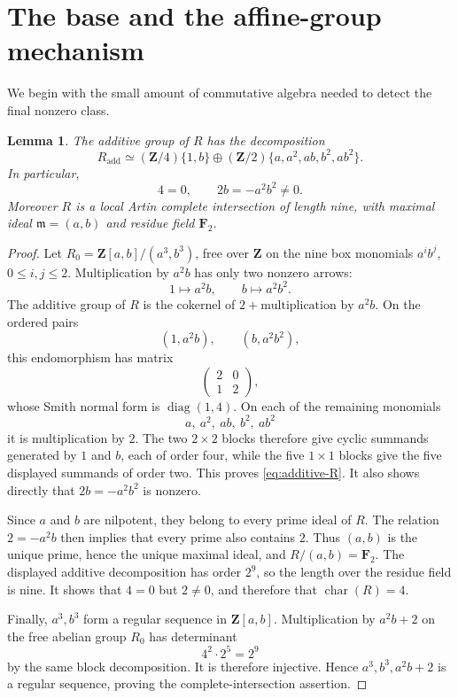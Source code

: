 \documentclass[11pt]{amsart}
\newtheorem{lemma}[theorem]{Lemma}
\theoremstyle{remark}
\newcommand{\Z}{\mathbf Z}
\newcommand{\F}{\mathbf F}
\newcommand{\m}{\mathfrak m}
\begin{document}
\section{The base and the affine-group mechanism}

We begin with the small amount of commutative algebra needed to detect
the final nonzero class.

\begin{lemma}\label{lem:base}
The additive group of \(R\) has the decomposition
\begin{equation}\label{eq:additive-R}
 R_{\mathrm{add}}\simeq
 (\Z/4)\{1,b\}\oplus
 (\Z/2)\{a,a^2,ab,b^2,ab^2\}.
\end{equation}
In particular,
\[
 4=0,\qquad 2b=-a^2b^2\ne0.
\]
Moreover \(R\) is a local Artin complete intersection of length nine,
with maximal ideal \(\m=(a,b)\) and residue field \(\F_2\).
\end{lemma}

\begin{proof}
Let \(R_0=\Z[a,b]/(a^3,b^3)\), free over \(\Z\) on the nine box
monomials \(a^ib^j\), \(0\le i,j\le2\).  Multiplication by \(a^2b\)
has only two nonzero arrows:
\[
 1\longmapsto a^2b,\qquad b\longmapsto a^2b^2.
\]
The additive group of \(R\) is the cokernel of
\(2+\text{multiplication by }a^2b\).  On the ordered pairs
\[
 (1,a^2b),\qquad (b,a^2b^2),
\]
this endomorphism has matrix
\[
 \begin{pmatrix}2&0\\1&2\end{pmatrix},
\]
whose Smith normal form is \(\operatorname{diag}(1,4)\).  On each of
the remaining monomials
\[
 a,\ a^2,\ ab,\ b^2,\ ab^2
\]
it is multiplication by \(2\).  The two \(2\times2\) blocks therefore
give cyclic summands generated by \(1\) and \(b\), each of order four,
while the five \(1\times1\) blocks give the five displayed summands of
order two.  This proves \eqref{eq:additive-R}.  It also shows directly
that \(2b=-a^2b^2\) is nonzero.

Since \(a\) and \(b\) are nilpotent, they belong to every prime ideal
of \(R\).  The relation \(2=-a^2b\) then implies that every prime also
contains \(2\).  Thus \((a,b)\) is the unique prime, hence the unique
maximal ideal, and \(R/(a,b)=\F_2\).  The displayed additive
decomposition has order \(2^9\), so the length over the residue field
is nine.  It shows that \(4=0\) but \(2\ne0\), and therefore that
\(\operatorname{char}(R)=4\).

Finally, \(a^3,b^3\) form a regular sequence in \(\Z[a,b]\).
Multiplication by \(a^2b+2\) on the free abelian group \(R_0\) has
determinant
\[
 4^2\cdot2^5=2^9
\]
by the same block decomposition.  It is therefore injective.  Hence
\(a^3,b^3,a^2b+2\) is a regular sequence, proving the
complete-intersection assertion.
\end{proof}
\end{document}
